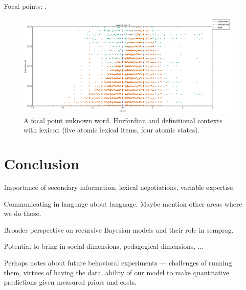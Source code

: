 \documentclass{article}
\begin{document}
Focal points: .

\begin{figure}[tp]
  \centering
  \includegraphics[width=1\textwidth]{fig/lex5-alpha-beta-gamma-X}
  \caption{A focal point unknown word. Hurfordian and definitional contexts with 
    lexicon (five atomic lexical items, four atomic states).} 
  \label{fig:char-focal}
\end{figure}



\section{Conclusion}\label{sec:conclusion}

Importance of secondary information, lexical negotiations, variable
expertise.

Communicating in language about language. Maybe mention other areas
where we do those.

Broader perspective on recursive Bayesian models and their role in
semprag.

Potential to bring in social dimensions, pedagogical dimensions, ...

Perhaps notes about future behavioral experiments --- challenges of
running them, virtues of having the data, ability of our model to make
quantitative predictions given measured priors and costs.




\end{document}
